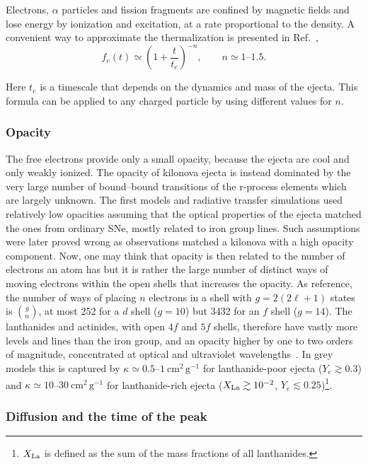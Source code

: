 Electrons, $\alpha$ particles and fission fragments are confined by magnetic fields and lose energy by ionization and excitation, at a rate proportional to the density.
A convenient way to approximate the thermalization is presented in Ref.~\cite{kasen_radioactive_2019},
\begin{equation}\label{eq:te}
  f_e(t)\simeq\left(1+\frac{t}{t_e}\right)^{-n},\qquad n\simeq1\text{--}1.5.
\end{equation}

Here $t_e$ is a timescale that depends on the dynamics and mass of the ejecta.
This formula can be applied to any charged particle by using different values for $n$.

\subsubsection{Opacity}
 
The free electrons provide only a small opacity, because the ejecta are cool and only weakly ionized.
The opacity of kilonova ejecta is instead dominated by the very large number of bound--bound transitions of the r-process elements which are largely unknown.
The first models and radiative transfer simulations used relatively low opacities assuming that the  optical properties of the ejecta matched the ones from ordinary SNe, mostly related to iron group lines.
Such assumptions were later proved wrong as observations matched a kilonova with a high opacity component.
Now, one may think that opacity is then related to the number of electrons an atom has but it is rather the large number of distinct ways of moving electrons within the open shells that increases the opacity. 
As reference, the number of ways of placing $n$ electrons in a shell with $g=2(2\ell+1)$ states is $\binom{g}{n}$, at most 252 for a $d$ shell ($g=10$) but 3432 for an $f$ shell ($g=14$).
The lanthanides and actinides, with open $4f$ and $5f$ shells, therefore have vastly more levels and lines than the iron group, and an opacity higher by one to two orders of magnitude, concentrated at optical and ultraviolet wavelengths~\cite{kasen_opacities_2013,tanaka_systematic_2020}.
In grey models this is captured by $\kappa\simeq0.5$--$1~\mathrm{cm^{2}\,g^{-1}}$ for lanthanide-poor ejecta ($Y_e\gtrsim0.3$) and $\kappa\simeq10$--$30~\mathrm{cm^{2}\,g^{-1}}$ for lanthanide-rich ejecta ($X_{\rm La}\gtrsim10^{-2}$, $Y_e\lesssim0.25$)\footnote{$X_{\rm La}$ is defined as the sum of the mass fractions of all lanthanides.}.
 
\subsubsection{Diffusion and the time of the peak}
 
